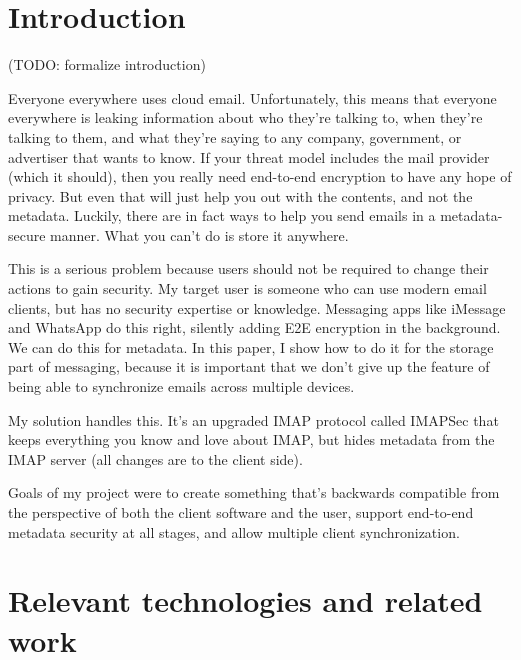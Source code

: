 \documentclass[pageno]{jpaper}
\newcommand{\project}{IMAPSec }
\begin{document}
\newpage

\tableofcontents

\newpage

\section{Introduction}

(TODO: formalize introduction)

Everyone everywhere uses cloud email. Unfortunately, this means that everyone everywhere is leaking information about who they're talking to, when they're talking to them, and what they're saying to any company, government, or advertiser that wants to know. If your threat model includes the mail provider (which it should), then you really need end-to-end encryption to have any hope of privacy. But even that will just help you out with the contents, and not the metadata. Luckily, there are in fact ways to help you  send emails in a metadata-secure manner. What you can't do is store it anywhere.

This is a serious problem because users should not be required to change their actions to gain security. My target user is someone who can use modern email clients, but has no security expertise or knowledge. Messaging apps like iMessage and WhatsApp do this right, silently adding E2E encryption in the background. We can do this for metadata. In this paper, I show how to do it for the storage part of messaging, because it is important that we don't give up the feature of being able to synchronize emails across multiple devices.

My solution handles this. It's an upgraded IMAP protocol called \project that keeps everything you know and love about IMAP, but hides metadata from the IMAP server (all changes are to the client side).

Goals of my project were to create something that's backwards compatible from the perspective of both the client software and the user, support end-to-end metadata security at all stages, and allow multiple client synchronization.


\section{Relevant technologies and related work}
\end{document}
